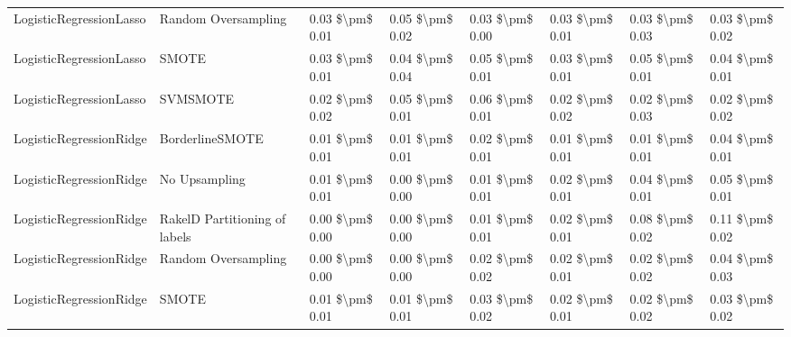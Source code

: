 \begin{tabular}{llllllll}
        LogisticRegressionLasso &           Random Oversampling & 0.03 \$\textbackslash pm\$ 0.01 &           0.05 \$\textbackslash pm\$ 0.02 &       0.03 \$\textbackslash pm\$ 0.00 &        0.03 \$\textbackslash pm\$ 0.01 &                         0.03 \$\textbackslash pm\$ 0.03 &     0.03 \$\textbackslash pm\$ 0.02 \\
        LogisticRegressionLasso &                         SMOTE & 0.03 \$\textbackslash pm\$ 0.01 &           0.04 \$\textbackslash pm\$ 0.04 &       0.05 \$\textbackslash pm\$ 0.01 &        0.03 \$\textbackslash pm\$ 0.01 &                         0.05 \$\textbackslash pm\$ 0.01 &     0.04 \$\textbackslash pm\$ 0.01 \\
        LogisticRegressionLasso &                      SVMSMOTE & 0.02 \$\textbackslash pm\$ 0.02 &           0.05 \$\textbackslash pm\$ 0.01 &       0.06 \$\textbackslash pm\$ 0.01 &        0.02 \$\textbackslash pm\$ 0.02 &                         0.02 \$\textbackslash pm\$ 0.03 &     0.02 \$\textbackslash pm\$ 0.02 \\
        LogisticRegressionRidge &               BorderlineSMOTE & 0.01 \$\textbackslash pm\$ 0.01 &           0.01 \$\textbackslash pm\$ 0.01 &       0.02 \$\textbackslash pm\$ 0.01 &        0.01 \$\textbackslash pm\$ 0.01 &                         0.01 \$\textbackslash pm\$ 0.01 &     0.04 \$\textbackslash pm\$ 0.01 \\
        LogisticRegressionRidge &                 No Upsampling & 0.01 \$\textbackslash pm\$ 0.01 &           0.00 \$\textbackslash pm\$ 0.00 &       0.01 \$\textbackslash pm\$ 0.01 &        0.02 \$\textbackslash pm\$ 0.01 &                         0.04 \$\textbackslash pm\$ 0.01 &     0.05 \$\textbackslash pm\$ 0.01 \\
        LogisticRegressionRidge & RakelD Partitioning of labels & 0.00 \$\textbackslash pm\$ 0.00 &           0.00 \$\textbackslash pm\$ 0.00 &       0.01 \$\textbackslash pm\$ 0.01 &        0.02 \$\textbackslash pm\$ 0.01 &                         0.08 \$\textbackslash pm\$ 0.02 &     0.11 \$\textbackslash pm\$ 0.02 \\
        LogisticRegressionRidge &           Random Oversampling & 0.00 \$\textbackslash pm\$ 0.00 &           0.00 \$\textbackslash pm\$ 0.00 &       0.02 \$\textbackslash pm\$ 0.02 &        0.02 \$\textbackslash pm\$ 0.01 &                         0.02 \$\textbackslash pm\$ 0.02 &     0.04 \$\textbackslash pm\$ 0.03 \\
        LogisticRegressionRidge &                         SMOTE & 0.01 \$\textbackslash pm\$ 0.01 &           0.01 \$\textbackslash pm\$ 0.01 &       0.03 \$\textbackslash pm\$ 0.02 &        0.02 \$\textbackslash pm\$ 0.01 &                         0.02 \$\textbackslash pm\$ 0.02 &     0.03 \$\textbackslash pm\$ 0.02 \\

\end{tabular}
